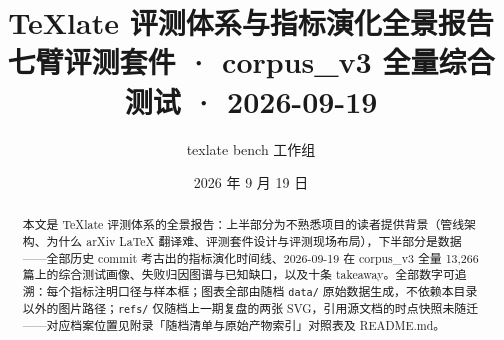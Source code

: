 \documentclass[11pt,a4paper]{ctexart}
\title{\bfseries TeXlate 评测体系与指标演化全景报告\\[4pt]
  \large 七臂评测套件 · corpus\_v3 全量综合测试 · 2026-09-19}
\author{texlate bench 工作组}
\date{2026 年 9 月 19 日}
\begin{document}
\maketitle

\begin{abstract}
\noindent 本文是 TeXlate 评测体系的全景报告：上半部分为不熟悉项目的读者提供背景（管线架构、为什么 arXiv LaTeX 翻译难、评测套件设计与评测现场布局），下半部分是数据——全部历史 commit 考古出的指标演化时间线、2026-09-19 在 corpus\_v3 全量 13{,}266 篇上的综合测试画像、失败归因图谱与已知缺口，以及十条 takeaway。全部数字可追溯：每个指标注明口径与样本框；图表全部由随档 \texttt{data/} 原始数据生成，不依赖本目录以外的图片路径；\texttt{refs/} 仅随档上一期复盘的两张 SVG，引用源文档的时点快照未随迁——对应档案位置见附录「随档清单与原始产物索引」对照表及 README.md。
\end{abstract}

\vspace{1em}
\tableofcontents
\newpage

\end{document}
